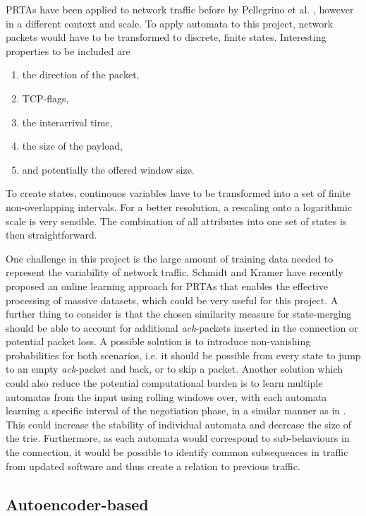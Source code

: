 \documentclass[a4paper,12pt,twoside]{report}
\begin{document}
PRTAs have been applied to network traffic before by Pellegrino et al. \cite{pellegrino2017learning}, however in a different context and scale. To apply automata to this project, network packets would have to be transformed to discrete, finite states. Interesting properties to be included are 

\begin{enumerate}
\item the direction of the packet,
\item TCP-flags,
\item the interarrival time,
\item the size of the payload,
\item and potentially the offered window size.
\end{enumerate}

To create states, continouos variables have to be transformed into a set of finite non-overlapping intervals. For a better resolution, a rescaling onto a logarithmic scale is very sensible. The combination of all attributes into one set of states is then straightforward. 

One challenge in this project is the large amount of training data needed to represent the variability of network traffic. Schmidt and Kramer \cite{schmidt2014online} have recently proposed an online learning approach for PRTAs that enables the effective processing of massive datasets, which could be very useful for this project. A further thing to consider is that the chosen similarity measure for state-merging should be able to account for additional \textit{ack}-packets inserted in the connection or potential packet loss. A possible solution is to introduce non-vanishing probabilities for both scenarios, i.e. it should be possible from every state to jump to an empty \textit{ack}-packet and back, or to skip a packet. Another solution which could also reduce the potential computational burden is to learn multiple automatas from the input using rolling windows over, with each automata learning a specific interval of the negotiation phase, in a similar manner as in \cite{pellegrino2017learning}. This could increase the stability of individual automata and decrease the size of the trie. Furthermore, as each automata would correspond to sub-behaviours in the connection, it would be possible to identify common subsequences in traffic from updated software and thus create a relation to previous traffic. 

\subsection{Autoencoder-based}\label{AUTOBASED}
\end{document}
